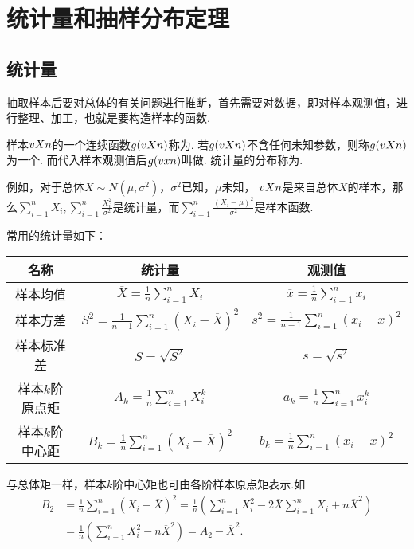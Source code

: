 \section{统计量和抽样分布定理}
\subsection{统计量}
抽取样本后要对总体的有关问题进行推断，首先需要对数据，即对样本观测值，进行整理、加工，也就是要构造样本的函数.

\begin{definition}
\def\g#1{g(\v{#1}{n})}
样本\(v{X}{n}\)的一个连续函数\(\g{X}\)称为.
若\(\g{X}\)不含任何未知参数，则称\(\g{X}\)为一个.
而代入样本观测值后\(\g{x}\)叫做.
统计量的分布称为.

例如，对于总体\(X \sim N(\mu,\sigma^2)\)，\(\sigma^2\)已知，\(\mu\)未知，%
\(v{X}{n}\)是来自总体\(X\)的样本，那么\(\sum\limits_{i=1}^n X_i, \sum\limits_{i=1}^n \frac{X_i^2}{\sigma^2}\)是统计量，而\(\sum\limits_{i=1}^n \frac{(X_i-\mu)^2}{\sigma^2}\)是样本函数.

常用的统计量如下：
\begin{center}
\begin{tabular}{*3c}
\hline
名称 & 统计量 & 观测值 \\ \hline
样本均值 & \(\overline{X} = \frac{1}{n} \sum\limits_{i=1}^n X_i\)
    & \(\overline{x} = \frac{1}{n} \sum\limits_{i=1}^n x_i\) \\[.5cm]
样本方差 & \(S^2 = \frac{1}{n-1} \sum\limits_{i=1}^n (X_i-\overline{X})^2\)
    & \(s^2 = \frac{1}{n-1} \sum\limits_{i=1}^n (x_i-\overline{x})^2\) \\[.5cm]
样本标准差 & \(S=\sqrt{S^2}\) & \(s=\sqrt{s^2}\) \\[.5cm]
样本\(k\)阶原点矩 & \(A_k=\frac{1}{n} \sum\limits_{i=1}^n X_i^k\)
    & \(a_k=\frac{1}{n} \sum\limits_{i=1}^n x_i^k\) \\[.5cm]
样本\(k\)阶中心距 & \(B_k=\frac{1}{n} \sum\limits_{i=1}^n (X_i-\overline{X})^2\)
    & \(b_k=\frac{1}{n} \sum\limits_{i=1}^n (x_i-\overline{x})^2\) \\[.5cm]
\hline
\end{tabular}
\end{center}
\end{definition}

与总体矩一样，样本\(k\)阶中心矩也可由各阶样本原点矩表示.如\begin{align*}
B_2 &= \frac{1}{n} \sum\limits_{i=1}^n{(X_i-\overline{X})^2}
= \frac{1}{n} \left(\sum\limits_{i=1}^n{X_i^2}-2\overline{X}\sum\limits_{i=1}^n{X_i}+n\overline{X}^2\right) \\
&= \frac{1}{n} \left(\sum\limits_{i=1}^n{X_i^2}-n\overline{X}^2\right)
= A_2 - \overline{X}^2.
\end{align*}


